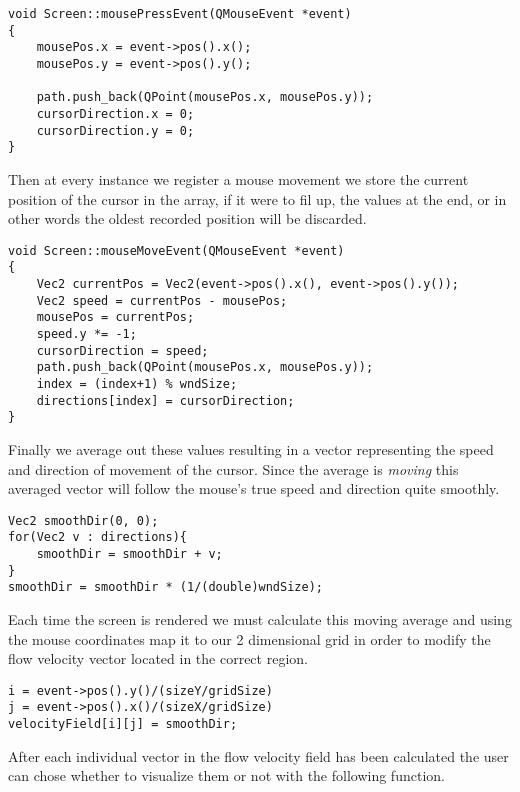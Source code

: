 \documentclass[15pt, titlepage]{article}
\begin{document}
\pagebreak

\begin{lstlisting}
void Screen::mousePressEvent(QMouseEvent *event)
{
    mousePos.x = event->pos().x();
    mousePos.y = event->pos().y();

    path.push_back(QPoint(mousePos.x, mousePos.y));
    cursorDirection.x = 0;
    cursorDirection.y = 0;
}
\end{lstlisting}

\bigskip

Then at every instance we register a mouse movement we store the current position of the cursor in the array, if it were to fil up, the values at the end, or in other words the oldest recorded position will be discarded.

\begin{lstlisting}
void Screen::mouseMoveEvent(QMouseEvent *event)
{
    Vec2 currentPos = Vec2(event->pos().x(), event->pos().y());
    Vec2 speed = currentPos - mousePos;
    mousePos = currentPos;
    speed.y *= -1;
    cursorDirection = speed;
    path.push_back(QPoint(mousePos.x, mousePos.y));
    index = (index+1) % wndSize;
    directions[index] = cursorDirection;
}
\end{lstlisting}

\bigskip

Finally we average out these values resulting in a vector representing the speed and direction of movement of the cursor. Since the average is \textit{moving} this averaged vector will follow the mouse's true speed and direction quite smoothly.

\begin{lstlisting}
Vec2 smoothDir(0, 0);
for(Vec2 v : directions){
    smoothDir = smoothDir + v;
}
smoothDir = smoothDir * (1/(double)wndSize);
\end{lstlisting}

\bigskip

Each time the screen is rendered we must calculate this moving average and using the mouse coordinates map it to our 2 dimensional grid in order to modify the flow velocity vector located in the correct region.

\begin{lstlisting}
i = event->pos().y()/(sizeY/gridSize)
j = event->pos().x()/(sizeX/gridSize)
velocityField[i][j] = smoothDir;
\end{lstlisting}

After each individual vector in the flow velocity field has been calculated the user can chose whether to visualize them or not with the following function.
\end{document}
